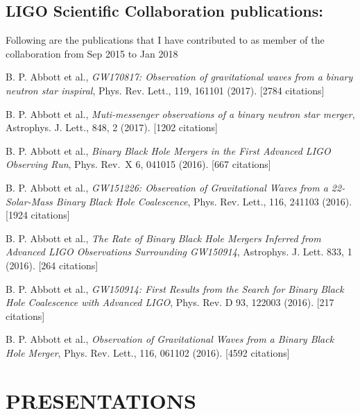 \subsection{\textbf{LIGO Scientific Collaboration publications: }} 
Following are the publications that I have contributed to as member of the collaboration from Sep 2015 to Jan 2018
\vspace{1mm}
\begin{etaremune}
\renewcommand{\labelenumi}{\textcolor{gray}{\arabic{enumi}.}}
\item{B. P. Abbott et al., \textit{GW170817: Observation of gravitational waves from a binary neutron star inspiral}, Phys. Rev. Lett., 119, 161101 (2017). [2784 citations]}

\item{B. P. Abbott et al., \textit{Muti-messenger observations of a binary neutron star merger}, Astrophys. J. Lett., 848, 2 (2017). [1202 citations]}

\item{B. P. Abbott et al., \textit{Binary Black Hole Mergers in the First Advanced LIGO Observing Run}, Phys. Rev.~X 6, 041015 (2016). [667 citations]}

\item{B. P. Abbott et al., \textit{GW151226: Observation of Gravitational Waves from a 22-Solar-Mass Binary Black Hole Coalescence}, Phys. Rev. Lett., 116, 241103 (2016). [1924 citations]}

\item{B. P. Abbott et al., \textit{The Rate of Binary Black Hole Mergers Inferred from Advanced LIGO Observations Surrounding GW150914}, Astrophys. J. Lett. 833, 1 (2016). [264 citations]}

\item{B. P. Abbott et al., \textit{GW150914: First Results from the Search for Binary Black Hole Coalescence with Advanced LIGO}, Phys. Rev. D 93, 122003 (2016). [217 citations]}

\item{B. P. Abbott et al., \textit{Observation of Gravitational Waves from a Binary Black Hole Merger}, Phys. Rev. Lett., 116, 061102 (2016). [4592 citations]}
\end{etaremune}

\section{PRESENTATIONS}
\vspace{1mm}
